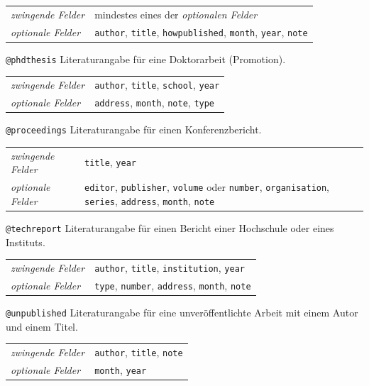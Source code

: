 \documentclass[a4paper,10pt,twoside]{scrbook}
\begin{document}
{\begin{tabular}{p{2.8cm}p{10cm}}
	 \textsl{zwingende Felder} & mindestes eines der \textsl{optionalen Felder}\\
	 \textsl{optionale Felder} & \texttt{author}, \texttt{title}, \texttt{howpublished}, \texttt{month}, \texttt{year}, \texttt{note}\\
\end{tabular}

\verb!@phdthesis! Literaturangabe für eine Doktorarbeit (Promotion).

\begin{tabular}{p{3cm}p{9cm}}
	 \textsl{zwingende Felder} & \texttt{author}, \texttt{title}, \texttt{school}, \texttt{year}\\
	 \textsl{optionale Felder} & \texttt{address}, \texttt{month}, \texttt{note}, \texttt{type}\\
\end{tabular}

\verb!@proceedings! Literaturangabe für einen Konferenzbericht.

\begin{tabular}{p{2.8cm}p{10cm}}
	 \textsl{zwingende Felder} & \texttt{title}, \texttt{year}\\
	 \textsl{optionale Felder} & \texttt{editor}, \texttt{publisher}, \texttt{volume} oder \texttt{number}, \texttt{organisation}, \texttt{series}, \texttt{address}, \texttt{month}, \texttt{note} \\
\end{tabular}

\verb!@techreport! Literaturangabe für einen Bericht einer Hochschule oder eines Instituts.

\begin{tabular}{p{2.8cm}p{10cm}}
	 \textsl{zwingende Felder} & \texttt{author}, \texttt{title}, \texttt{institution}, \texttt{year}\\
	 \textsl{optionale Felder} & \texttt{type}, \texttt{number}, \texttt{address}, \texttt{month}, \texttt{note} \\
\end{tabular}

\verb!@unpublished! Literaturangabe für eine unveröffentlichte Arbeit mit einem Autor und einem Titel.

\begin{tabular}{p{2.8cm}p{10cm}}
	 \textsl{zwingende Felder} & \texttt{author}, \texttt{title}, \texttt{note}\\
	 \textsl{optionale Felder} & \texttt{month}, \texttt{year} \\
\end{tabular}






}
\end{document}
